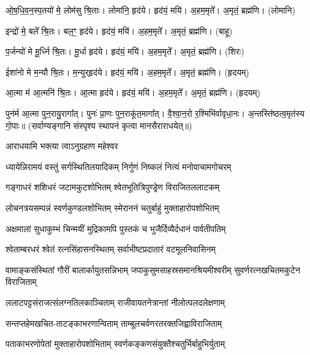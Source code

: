    ओ॒ष॒धि॒व॒न॒स्प॒तयो॑ मे॒ लोम॑सु श्रि॒ताः।   लोमा॑नि॒ हृद॑ये।   हृद॑यं॒ मयि॑।   अ॒हम॒मृते᳚।   अ॒मृतं॒ ब्रह्म॑णि। (लोमानि)

   इन्द्रो॑ मे॒ बले᳚ श्रि॒तः।   बल॒ꣳ॒ हृद॑ये।   हृद॑यं॒ मयि॑।   अ॒हम॒मृते᳚।   अ॒मृतं॒ ब्रह्म॑णि। (बाहू)

   प॒र्जन्यो॑ मे मू॒र्ध्नि श्रि॒तः।   मू॒र्धा हृद॑ये।   हृद॑यं॒ मयि॑।   अ॒हम॒मृते᳚।   अ॒मृतं॒ ब्रह्म॑णि। (शिरः)

   ईशा॑नो मे म॒न्यौ श्रि॒तः।   म॒न्युर्‌हृद॑ये।   हृद॑यं॒ मयि॑।    अ॒हम॒मृते᳚।   अ॒मृतं॒ ब्रह्म॑णि। (हृदयम्)

   आ॒त्मा म॑ आ॒त्मनि॑ श्रि॒तः।   आ॒त्मा हृद॑ये।   हृद॑यं॒ मयि॑।   अ॒हम॒मृते᳚।   अ॒मृतं॒ ब्रह्म॑णि।
(हृदयम्)

   पुन॑र्म आ॒त्मा पुन॒रायु॒रागा᳚त्।   पुनः॑ प्रा॒णः पुन॒राकू॑त॒मागा᳚त्।   वै॒श्वा॒न॒रो र॒श्मिभि॑र्वावृधा॒नः।   अ॒न्तस्ति॑ष्ठत्व॒मृत॑स्य गो॒पाः॥ (सर्वाण्यङ्गानि संस्पृश्य स्थापनं कृत्वा मानसैराराधयेत्॥)

{\small \closesection}


{आराधयामि भक्त्या त्वाऽनुग्रहाण महेश्वर}



\twolineshloka
{ध्यायेन्निरामयं वस्तुं सर्गस्थितिलयादिकम्}
{निर्गुणं निष्कलं नित्यं मनोवाचामगोचरम्}

\twolineshloka
{गङ्गाधरं शशिधरं जटामकुटशोभितम्}
{श्वेतभूतित्रिपुण्ड्रेण विराजितललाटकम्}

\twolineshloka
{लोचनत्रयसम्पन्नं स्वर्णकुण्डलशोभितम्}
{स्मेराननं चतुर्बाहुं मुक्ताहारोपशोभितम्}

\twolineshloka
{अक्षमालां सुधाकुम्भं चिन्मयीं मुद्रिकामपि}
{पुस्तकं च भुजैर्दिव्यैर्दधानं पार्वतीपतिम्}

\twolineshloka
{श्वेताम्बरधरं श्वेतं रत्नसिंहासनस्थितम्}
{सर्वाभीष्टप्रदातारं वटमूलनिवासिनम्}

\threelineshloka
{वामाङ्कसंस्थितां गौरीं बालार्कायुतसन्निभाम्}
{जपाकुसुमसाहस्रसमानश्रियमीश्वरीम्}
{सुवर्णरत्नखचितमकुटेन विराजिताम्}

\twolineshloka
{ललाटपट्टसंराजत्संलग्नतिलकाञ्चिताम्}
{राजीवायतनेत्रान्तां नीलोत्पलदलेक्षणाम्}

\twolineshloka
{सन्तप्तहेमखचित-ताटङ्काभरणान्विताम्}
{ताम्बूलचर्वणरतरक्तजिह्वाविराजिताम्}

\twolineshloka
{पताकाभरणोपेतां मुक्ताहारोपशोभिताम्}
{स्वर्णकङ्कणसंयुक्तैश्चतुर्भिर्बाहुभिर्युताम्}

